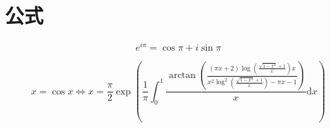 \section{公式}

\[
    e^{i\pi}=\cos\pi+i\sin\pi
\]

\[
    x=\cos x\iff x=\frac{\pi}{2}\exp\left(\frac{1}{\pi}\int_0^1\frac{\arctan\left(\frac{(\pi x+2)\log\left(\frac{\sqrt{1-x^2}+1}{x}\right)x}{x^2\log^2\left(\frac{\sqrt{1-x^2}+1}{x}\right)-\pi x-1}\right)}{x}\mathrm{d}x\right)
\]